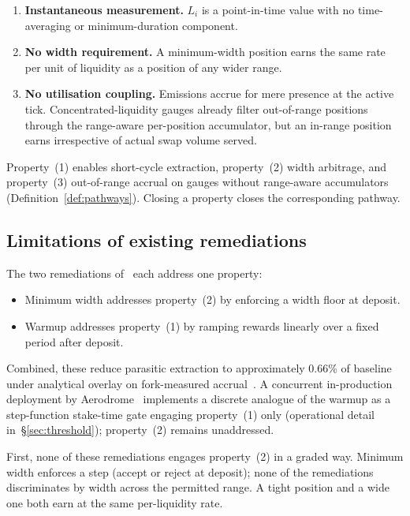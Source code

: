 \documentclass[11pt,a4paper]{article}
\theoremstyle{cgdefinition}
\theoremstyle{cgplain}
\theoremstyle{cgremark}
\begin{document}
\begin{enumerate}[leftmargin=2em]
\item \textbf{Instantaneous measurement.} $L_i$ is a point-in-time value with no time-averaging or minimum-duration component.
\item \textbf{No width requirement.} A minimum-width position earns the same rate per unit of liquidity as a position of any wider range.
\item \textbf{No utilisation coupling.} Emissions accrue for mere presence at the active tick. Concentrated-liquidity gauges already filter out-of-range positions through the range-aware per-position accumulator, but an in-range position earns irrespective of actual swap volume served.
\end{enumerate}

Property~(1) enables short-cycle extraction, property~(2) width arbitrage, and property~(3) out-of-range accrual on gauges without range-aware accumulators (Definition~\ref{def:pathways}). Closing a property closes the corresponding pathway.

\subsection{Limitations of existing remediations}\label{sec:insufficient}

The two remediations of~\cite{ryan2026c} each address one property:

\begin{itemize}[leftmargin=2em]
\item Minimum width addresses property~(2) by enforcing a width floor at deposit.
\item Warmup addresses property~(1) by ramping rewards linearly over a fixed period after deposit.
\end{itemize}

Combined, these reduce parasitic extraction to approximately 0.66\% of baseline under analytical overlay on fork-measured accrual~\cite[\S5.3]{ryan2026c}. A concurrent in-production deployment by Aerodrome~\cite{aerodrome2026} implements a discrete analogue of the warmup as a step-function stake-time gate engaging property~(1) only (operational detail in~\S\ref{sec:threshold}); property~(2) remains unaddressed.

First, none of these remediations engages property~(2) in a graded way. Minimum width enforces a step (accept or reject at deposit); none of the remediations discriminates by width across the permitted range. A tight position and a wide one both earn at the same per-liquidity rate.
\end{document}
